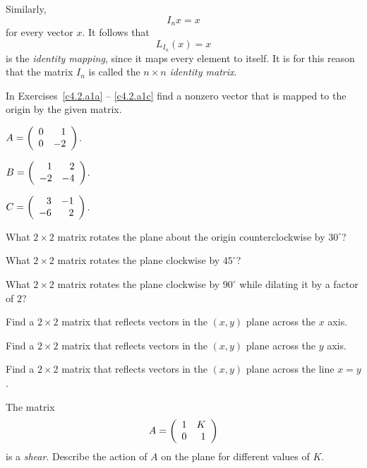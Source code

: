 Similarly,
\[
I_nx=x
\]
for every vector $x$.  It follows that
\[
L_{I_n}(x) = x
\]
is the {\em identity mapping\/},  since
it maps every element to itself.  It is for this reason that the
matrix $I_n$ is called the $n\times n$ {\em identity matrix\/}.

\EXER

\TEXER

\noindent In Exercises~\ref{c4.2.a1a} -- \ref{c4.2.a1c} find a nonzero
vector that is mapped to the origin by the given matrix.
\begin{exercise} \label{c4.2.a1a}
$A=\left(\begin{array}{rr} 0 & 1\\ 0 &-2\end{array}\right)$.
\end{exercise}
\begin{exercise} \label{c4.2.a1b}
$B=\left(\begin{array}{rr} 1 & 2\\ -2 &-4\end{array}\right)$.
\end{exercise}
\begin{exercise} \label{c4.2.a1c}
$C=\left(\begin{array}{rr} 3 & -1\\ -6 &2\end{array}\right)$.
\end{exercise}


\begin{exercise} \label{c4.2.1a}
What $2\times 2$ matrix rotates the plane about the origin counterclockwise
by $30^\circ$?
\end{exercise}
\begin{exercise} \label{c4.2.1b}
What $2\times 2$ matrix rotates the plane clockwise by $45^\circ$?
\end{exercise}
\begin{exercise} \label{c4.2.1c}
What $2\times 2$ matrix rotates the plane clockwise by $90^\circ$ while
dilating it by a factor of $2$?
\end{exercise}

\begin{exercise} \label{c4.2.2a}
Find a $2\times 2$ matrix that reflects vectors in the $(x,y)$ plane across
the $x$ axis.
\end{exercise}
\begin{exercise} \label{c4.2.2b}
Find a $2\times 2$ matrix that reflects vectors in the $(x,y)$ plane across
the $y$ axis.
\end{exercise}
\begin{exercise} \label{c4.2.2c}
Find a $2\times 2$ matrix that reflects vectors in the $(x,y)$ plane across
the line $x=y$.
\end{exercise}

\begin{exercise} \label{c7.8.1}
The matrix
\[
A=\left(\begin{array}{rr} 1 & K\\ 0 &1\end{array}\right)
\]
is a {\em shear}.  Describe the action of $A$ on the plane
for different values of $K$.
\end{exercise}

